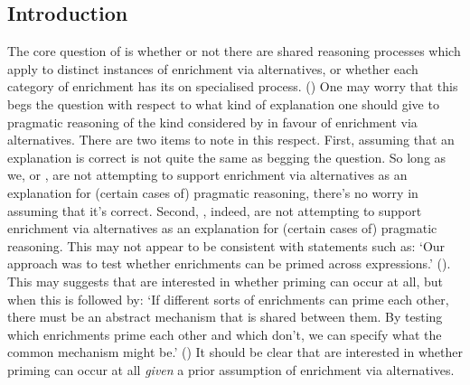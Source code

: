 \documentclass[10pt]{article}
\begin{document}
\begin{multicols}{2}



\section{Introduction}
\label{sec:introduction}

The core question of \textcite{Bott:2016aa} is whether or not there are shared reasoning processes which apply to distinct instances of enrichment via alternatives, or whether each category of enrichment has its on specialised process.
(\citeyear[118]{Bott:2016aa})
One may worry that this begs the question with respect to what kind of explanation one should give to pragmatic reasoning of the kind considered by \citeauthor{Bott:2016aa} in favour of enrichment via alternatives.
There are two items to note in this respect.
First, assuming that an explanation is correct is not quite the same as begging the question.
So long as we, or \citeauthor{Bott:2016aa}, are not attempting to support enrichment via alternatives as an explanation for (certain cases of) pragmatic reasoning, there's no worry in assuming that it's correct.
Second, \citeauthor{Bott:2016aa}, indeed, are not attempting to support enrichment via alternatives as an explanation for (certain cases of) pragmatic reasoning.
This may not appear to be consistent with statements such as:
`Our approach was to test whether enrichments can be primed across expressions.' (\citeyear[118]{Bott:2016aa}).
This may suggests that \citeauthor{Bott:2016aa} are interested in whether priming can occur at all, but when this is followed by:
`If different sorts of enrichments can prime each other, there must be an abstract mechanism that is shared between them.
By testing which enrichments prime each other and which don’t, we can specify what the common mechanism might be.' (\citeyear[118]{Bott:2016aa})
It should be clear that \citeauthor{Bott:2016aa} are interested in whether priming can occur at all \emph{given} a prior assumption of enrichment via alternatives.


\end{multicols}
\end{document}
